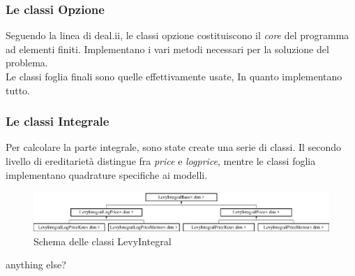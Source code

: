 \documentclass{beamer}
\begin{document}

\begin{frame}[t]
 \frametitle{Le classi Opzione}

 Seguendo la linea di \textsf{deal.ii}, le classi opzione costituiscono il \emph{core} del programma ad elementi finiti. Implementano i vari metodi necessari per la soluzione del problema.\\ Le classi foglia finali sono quelle effettivamente usate, In quanto implementano tutto.
\end{frame}

\begin{frame}[t]
 \frametitle{Le classi Integrale}
 Per calcolare la parte integrale, sono state create una serie di classi. Il secondo livello di ereditarietà distingue fra \emph{price} e \emph{logprice}, mentre le classi foglia implementano quadrature specifiche ai modelli.

 \begin{figure}
  \centering
  \includegraphics[width=\linewidth]{classLevyIntegralBase}
 \caption{Schema delle classi LevyIntegral}
 \end{figure}
 \pause
 \begin{block}{anything else?}

 \end{block}
\end{frame}
\end{document}
